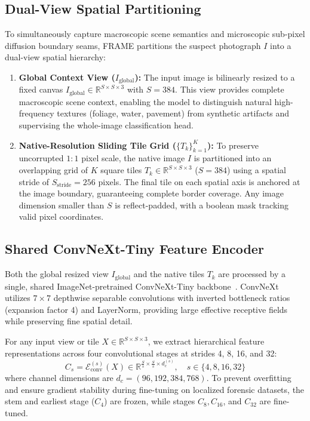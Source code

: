 \documentclass[sigconf,review=true]{acmart}
\begin{document}
\subsection{Dual-View Spatial Partitioning}
To simultaneously capture macroscopic scene semantics and microscopic sub-pixel diffusion boundary seams, FRAME partitions the suspect photograph $I$ into a dual-view spatial hierarchy:
\begin{enumerate}
    \item \textbf{Global Context View ($I_{\mathrm{global}}$):} The input image is bilinearly resized to a fixed canvas $I_{\mathrm{global}} \in \mathbb{R}^{S \times S \times 3}$ with $S = 384$. This view provides complete macroscopic scene context, enabling the model to distinguish natural high-frequency textures (foliage, water, pavement) from synthetic artifacts and supervising the whole-image classification head.
    \item \textbf{Native-Resolution Sliding Tile Grid ($\{T_k\}_{k=1}^K$):} To preserve uncorrupted $1:1$ pixel scale, the native image $I$ is partitioned into an overlapping grid of $K$ square tiles $T_k \in \mathbb{R}^{S \times S \times 3}$ ($S = 384$) using a spatial stride of $S_{\mathrm{stride}} = 256$ pixels. The final tile on each spatial axis is anchored at the image boundary, guaranteeing complete border coverage. Any image dimension smaller than $S$ is reflect-padded, with a boolean mask tracking valid pixel coordinates.
\end{enumerate}

\subsection{Shared ConvNeXt-Tiny Feature Encoder}
Both the global resized view $I_{\mathrm{global}}$ and the native tiles $T_k$ are processed by a single, shared ImageNet-pretrained ConvNeXt-Tiny backbone~\cite{convnext}. ConvNeXt utilizes $7 \times 7$ depthwise separable convolutions with inverted bottleneck ratios (expansion factor 4) and LayerNorm, providing large effective receptive fields while preserving fine spatial detail.

For any input view or tile $X \in \mathbb{R}^{S \times S \times 3}$, we extract hierarchical feature representations across four convolutional stages at strides 4, 8, 16, and 32:
\begin{equation}
    C_s = \mathcal{E}_{\mathrm{conv}}^{(s)}(X) \in \mathbb{R}^{\frac{S}{s} \times \frac{S}{s} \times d_c^{(s)}}, \quad s \in \{4, 8, 16, 32\}
    \label{eq:encoder_stages}
\end{equation}
where channel dimensions are $d_c = (96, 192, 384, 768)$. To prevent overfitting and ensure gradient stability during fine-tuning on localized forensic datasets, the stem and earliest stage ($C_4$) are frozen, while stages $C_8, C_{16}$, and $C_{32}$ are fine-tuned.
\end{document}
